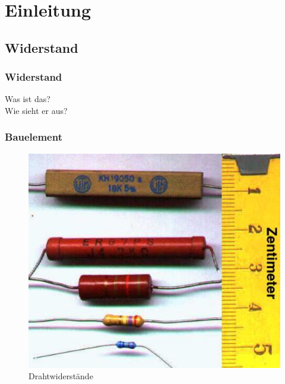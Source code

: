 

\subtitle{Technik Klasse E 04: \\
  Der Widerstand und seine Schaltungsarten \\[2em]}
\date{Stand 18.09.2017}


\section*{Einleitung}
\subsection*{Widerstand}

\begin{frame}
  \frametitle{Widerstand}
  \begin{center}
    \Large{Was ist das?} \\
    \Large{Wie sieht er aus?}
  \end{center}
\end{frame}


\begin{frame}
  \frametitle{Bauelement}

  \begin{center}
    \begin{figure}
      \includegraphics[width=1\textwidth,height=.75\textheight,keepaspectratio]{e04/Widerstaende.jpg}
      \caption{Drahtwiderstände \cite{wdst}}
      \label{fig_wdst}
    \end{figure}
  \end{center}


\end{frame}

